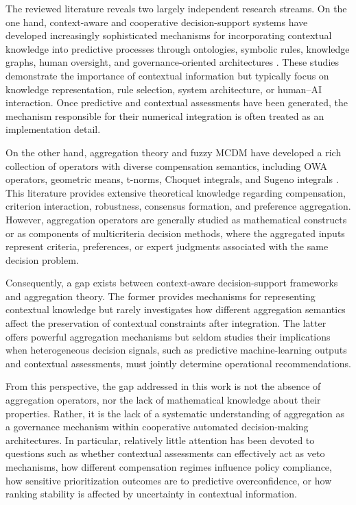 \documentclass[mathematics,article,submit,moreauthors]{Definitions/mdpi}
\begin{document}
The reviewed literature reveals two largely independent research
streams. On the one hand, context-aware and cooperative decision-support
systems have developed increasingly sophisticated mechanisms for
incorporating contextual knowledge into predictive processes through
ontologies, symbolic rules, knowledge graphs, human oversight, and
governance-oriented architectures
\citep{TengTan2008,YaoKumar2012,CronholmGoebel2022,Fanfani2025Human}.
These studies demonstrate the importance of contextual information but
typically focus on knowledge representation, rule selection, system
architecture, or human--AI interaction. Once predictive and contextual
assessments have been generated, the mechanism responsible for their
numerical integration is often treated as an implementation detail.

On the other hand, aggregation theory and fuzzy MCDM have developed a
rich collection of operators with diverse compensation semantics,
including OWA operators, geometric means, t-norms, Choquet integrals,
and Sugeno integrals
\citep{Yager1988,Yager2005,Mardani2018,Csiszar2021}. This literature
provides extensive theoretical knowledge regarding compensation,
criterion interaction, robustness, consensus formation, and preference
aggregation. However, aggregation operators are generally studied as
mathematical constructs or as components of multicriteria decision
methods, where the aggregated inputs represent criteria, preferences, or
expert judgments associated with the same decision problem.

Consequently, a gap exists between context-aware decision-support
frameworks and aggregation theory. The former provides mechanisms for
representing contextual knowledge but rarely investigates how different
aggregation semantics affect the preservation of contextual constraints
after integration. The latter offers powerful aggregation mechanisms but
seldom studies their implications when heterogeneous decision signals,
such as predictive machine-learning outputs and contextual assessments,
must jointly determine operational recommendations.

From this perspective, the gap addressed in this work is not the absence
of aggregation operators, nor the lack of mathematical knowledge about
their properties. Rather, it is the lack of a systematic understanding
of aggregation as a governance mechanism within cooperative automated
decision-making architectures. In particular, relatively little
attention has been devoted to questions such as whether contextual
assessments can effectively act as veto mechanisms, how different
compensation regimes influence policy compliance, how sensitive
prioritization outcomes are to predictive overconfidence, or how ranking
stability is affected by uncertainty in contextual information.
\end{document}
